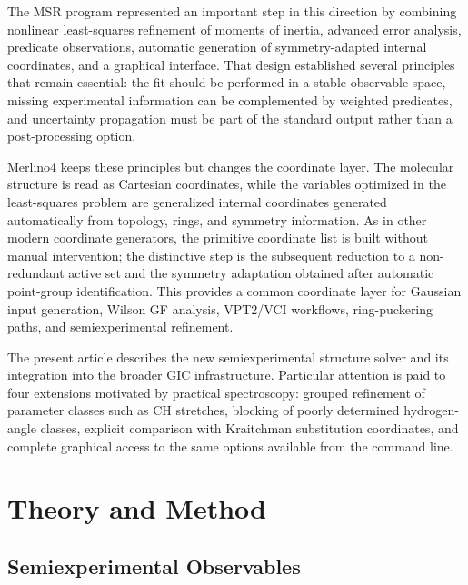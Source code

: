 \documentclass[journal=jctcce,manuscript=article,maxauthors=999]{achemso}
\begin{document}
The MSR program represented an important step in this direction by combining nonlinear least-squares refinement of moments of inertia, advanced error analysis, predicate observations, automatic generation of symmetry-adapted internal coordinates, and a graphical interface.\cite{Mendolicchio2017MSR} That design established several principles that remain essential: the fit should be performed in a stable observable space, missing experimental information can be complemented by weighted predicates, and uncertainty propagation must be part of the standard output rather than a post-processing option.

Merlino4 keeps these principles but changes the coordinate layer. The molecular structure is read as Cartesian coordinates, while the variables optimized in the least-squares problem are generalized internal coordinates generated automatically from topology, rings, and symmetry information. As in other modern coordinate generators, the primitive coordinate list is built without manual intervention; the distinctive step is the subsequent reduction to a non-redundant active set and the symmetry adaptation obtained after automatic point-group identification. This provides a common coordinate layer for Gaussian input generation, Wilson GF analysis, VPT2/VCI workflows, ring-puckering paths, and semiexperimental refinement.

The present article describes the new semiexperimental structure solver and its integration into the broader GIC infrastructure. Particular attention is paid to four extensions motivated by practical spectroscopy: grouped refinement of parameter classes such as CH stretches, blocking of poorly determined hydrogen-angle classes, explicit comparison with Kraitchman substitution coordinates, and complete graphical access to the same options available from the command line.

\section{Theory and Method}

\subsection{Semiexperimental Observables}
\end{document}
